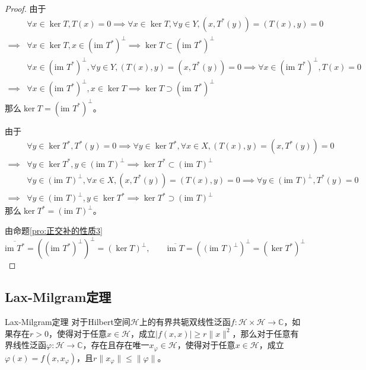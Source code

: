 \documentclass[lang = cn, scheme = chinese, thmcnt = section]{elegantbook}
\newcommand{\C}{\mathbb{C}}  		   %
\newcommand{\sub}{\subset}             %
\newcommand{\im}{\text{im }}           %
\begin{document}
\begin{proof}
	由于
	\begin{align*}
		&\forall x\in\ker T,T(x)=0
		\implies \forall x\in\ker T,\forall y\in Y,(x,T^*(y))=(T(x),y)=0\\
		\implies &\forall x\in\ker T,x\in (\im T^*)^\perp
		\implies \ker T\sub (\im T^*)^\perp\\
		& \forall x\in (\im T^*)^\perp,\forall y\in Y,(T(x),y)=(x,T^*(y))=0
		\implies \forall x\in (\im T^*)^\perp,T(x)=0\\
		\implies &\forall x\in (\im T^*)^\perp,x\in\ker T
		\implies \ker T\supset (\im T^*)^\perp
	\end{align*}
	那么$\ker T=(\im T^*)^\perp$。
	
	由于
	\begin{align*}
		&\forall y\in\ker T^*,T^*(y)=0
		\implies \forall y\in\ker T^*,\forall x\in X,(T(x),y)=(x,T^*(y))=0\\
		\implies &\forall y\in\ker T^*,y\in (\im T)^\perp
		\implies \ker T^*\sub (\im T)^\perp\\
		& \forall y\in (\im T)^\perp,\forall x\in X,(x,T^*(y))=(T(x),y)=0
		\implies \forall y\in (\im T)^\perp,T^*(y)=0\\
		\implies &\forall y\in (\im T)^\perp,y\in\ker T^*
		\implies \ker T^*\supset (\im T)^\perp
	\end{align*}
	那么$\ker T^*=(\im T)^\perp$。
	
	由命题\ref{pro:正交补的性质3}
	$$
	\overline{\im T^*}
	= ((\im T^*)^\perp)^\perp
	= (\ker T)^\perp,\qquad 
	\overline{\im T}
	= ((\im T)^\perp)^\perp
	= (\ker T^*)^\perp
	$$
\end{proof}

\subsection{Lax-Milgram定理}

\begin{theorem}{Lax-Milgram定理}
	对于Hilbert空间$\mathcal{H}$上的有界共轭双线性泛函$f:\mathcal{H}\times \mathcal{H}\to\C$，如果存在$r>0$，使得对于任意$x\in \mathcal{H}$，成立$|f(x,x)|\ge r\|x\|^2$，那么对于任意有界线性泛函$\varphi:\mathcal{H}\to \C$，存在且存在唯一$x_\varphi\in \mathcal{H}$，使得对于任意$x\in \mathcal{H}$，成立$\varphi(x)=f(x,x_\varphi)$，且$r\|x_\varphi\|\le\|\varphi\|$。
\end{theorem}
\end{document}
